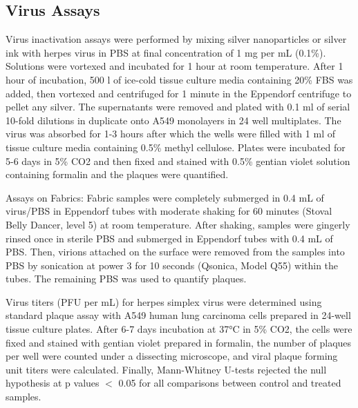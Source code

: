 \documentclass[journal=jacsat,manuscript=article]{achemso}
\begin{document}
\subsection{Virus Assays}
Virus inactivation assays were performed by mixing silver nanoparticles or silver ink with  herpes virus in PBS at final concentration of 1 mg per mL (0.1\%). Solutions were vortexed and incubated for 1 hour %
at room temperature. After 1 hour of incubation, 500 \micro l of ice-cold tissue culture media containing 20\% FBS was added, then vortexed and centrifuged for 1 minute in the Eppendorf centrifuge to pellet any silver. The supernatants were removed and plated with 0.1 ml of serial 10-fold dilutions in duplicate onto A549 monolayers in 24 well multiplates. The virus was absorbed for 1-3 hours after which the wells were filled with 1 ml of tissue culture media containing 0.5\% methyl cellulose.  Plates were incubated for 5-6 days in 5\% CO2 and then fixed and stained with 0.5\% gentian violet solution containing formalin and the plaques were quantified.

Assays on Fabrics: Fabric samples were completely submerged in 0.4 mL of virus/PBS in Eppendorf tubes with moderate shaking for 60 minutes (Stoval Belly Dancer, level 5) at room temperature. %
After shaking, samples were gingerly rinsed once in sterile PBS and submerged in Eppendorf tubes with 0.4 mL of PBS. Then, virions attached on the surface were removed from the samples into PBS by sonication at power 3 for 10 seconds (Qsonica, Model Q55) within the tubes. The remaining PBS was used to quantify plaques. 

Virus titers (PFU per mL) for herpes simplex virus were determined using standard plaque assay with A549 human lung carcinoma cells prepared in 24-well tissue culture plates. After 6-7 days incubation at 37°C in 5\% CO2, the cells were fixed and stained with gentian violet prepared in formalin, the number of plaques per well were counted under a dissecting microscope, and viral plaque forming unit titers were calculated. 
Finally, Mann-Whitney U-tests rejected the null hypothesis at p values $<$ 0.05 for all comparisons between control and treated samples.
\end{document}
